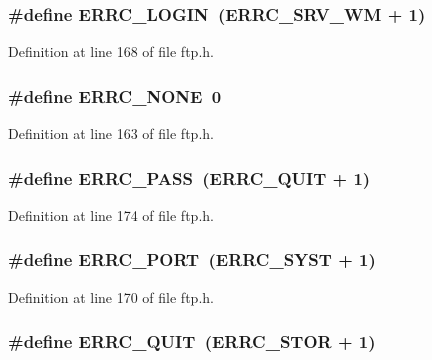 \hypertarget{group__ftp_ga21fc8afdf5c1b2ccef85b7d1dab9e291}{
\subsubsection[{ERRC\_\-LOGIN}]{\setlength{\rightskip}{0pt plus 5cm}\#define ERRC\_\-LOGIN~(ERRC\_\-SRV\_\-WM + 1)}}
\label{group__ftp_ga21fc8afdf5c1b2ccef85b7d1dab9e291}


Definition at line 168 of file ftp.h.

\hypertarget{group__ftp_gacc19481d3bff7e3c8e3b8804d2d2afcf}{
\subsubsection[{ERRC\_\-NONE}]{\setlength{\rightskip}{0pt plus 5cm}\#define ERRC\_\-NONE~0}}
\label{group__ftp_gacc19481d3bff7e3c8e3b8804d2d2afcf}


Definition at line 163 of file ftp.h.

\hypertarget{group__ftp_gae2f7eeda61eb20dbd08413b4729bb5b5}{
\subsubsection[{ERRC\_\-PASS}]{\setlength{\rightskip}{0pt plus 5cm}\#define ERRC\_\-PASS~(ERRC\_\-QUIT + 1)}}
\label{group__ftp_gae2f7eeda61eb20dbd08413b4729bb5b5}


Definition at line 174 of file ftp.h.

\hypertarget{group__ftp_gaf92586684d1c458f7675ece8677fe28f}{
\subsubsection[{ERRC\_\-PORT}]{\setlength{\rightskip}{0pt plus 5cm}\#define ERRC\_\-PORT~(ERRC\_\-SYST + 1)}}
\label{group__ftp_gaf92586684d1c458f7675ece8677fe28f}


Definition at line 170 of file ftp.h.

\hypertarget{group__ftp_gacd22c3d419804a0d9ab9621aa5eb9a0d}{
\subsubsection[{ERRC\_\-QUIT}]{\setlength{\rightskip}{0pt plus 5cm}\#define ERRC\_\-QUIT~(ERRC\_\-STOR + 1)}}
\label{group__ftp_gacd22c3d419804a0d9ab9621aa5eb9a0d}



